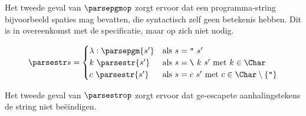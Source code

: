 Het tweede geval van $\parsepgmop$ zorgt ervoor dat een programma-string
bijvoorbeeld spaties mag bevatten, die syntactisch zelf geen betekenis hebben.
Dit is in overeenkomst met de specificatie, maar op zich niet nodig.

$$
	\parsestr s =
		\begin{cases}
			\lambda:\parsepgm{s'} & \text{als $s=\texttt{"}~s'$} \\
			k~\parsestr{s'} & \text{als $s=\texttt{\textbackslash}~k~s'$ met
				$k \in\Char$} \\
			c~\parsestr{s'} & \text{als $s=c~s'$ met $c
				\in\Char\setminus\{\texttt{"}\}$}\\
		\end{cases}
$$

Het tweede geval van $\parsestrop$ zorgt ervoor dat ge-escapete
aanhalingstekens de string niet beëindigen.

